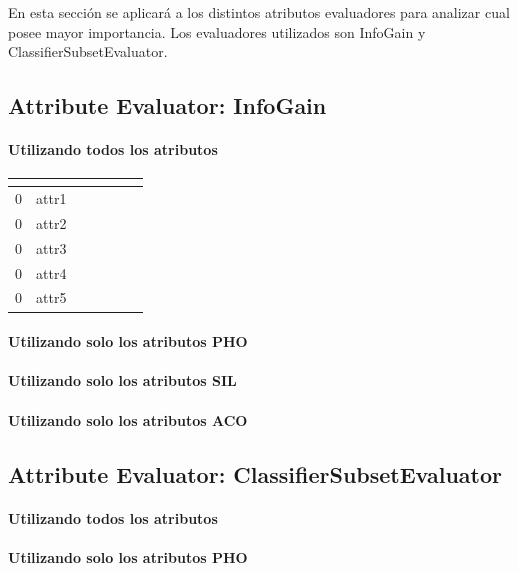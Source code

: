 \documentclass[11pt,a4paper,twoside]{tesis}
\begin{document}
En esta sección se aplicará a los distintos atributos evaluadores para analizar cual posee mayor importancia. Los evaluadores utilizados son InfoGain y ClassifierSubsetEvaluator. 

\subsection*{Attribute Evaluator: InfoGain}

\paragraph*{Utilizando todos los atributos}

\begin{table}[h]
\centering
\begin{tabular}{|l|c|c|c|c|c|c|}
\hline
\textbf{}  & \textbf{}  \\ \hline
0 & attr1\\ \hline
0 & attr2\\ \hline
0 & attr3\\ \hline
0 & attr4\\ \hline
0 & attr5\\ \hline
\end{tabular}
\end{table}

\paragraph*{Utilizando solo los atributos PHO}
\paragraph*{Utilizando solo los atributos SIL}
\paragraph*{Utilizando solo los atributos ACO}

\subsection*{Attribute Evaluator: ClassifierSubsetEvaluator}

\paragraph*{Utilizando todos los atributos}
\paragraph*{Utilizando solo los atributos PHO}
\end{document}
